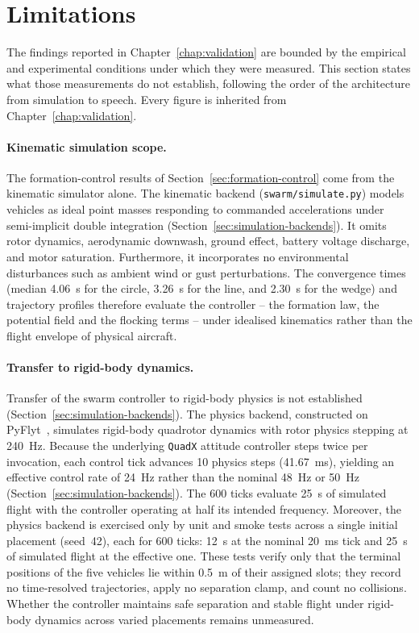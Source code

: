 \section{Limitations}
\label{sec:limitations}
The findings reported in Chapter~\ref{chap:validation} are bounded by the empirical and experimental
conditions under which they were measured. This section states what those measurements do not establish,
following the order of the architecture from simulation to speech. Every figure is inherited from
Chapter~\ref{chap:validation}.

\paragraph{Kinematic simulation scope.} The formation-control results of
Section~\ref{sec:formation-control} come from the kinematic simulator alone. The kinematic backend
(\texttt{swarm/simulate.py}) models vehicles as ideal point masses responding to commanded
accelerations under semi-implicit double integration (Section~\ref{sec:simulation-backends}). It
omits rotor dynamics, aerodynamic downwash, ground effect, battery voltage discharge, and motor
saturation. Furthermore, it incorporates no environmental disturbances such as ambient wind or gust
perturbations. The convergence times (median 4.06~s for the circle, 3.26~s for the line, and 2.30~s for
the wedge) and trajectory profiles therefore evaluate the controller -- the formation law, the
potential field and the flocking terms -- under idealised kinematics rather than the flight envelope
of physical aircraft.

\paragraph{Transfer to rigid-body dynamics.} Transfer of the swarm controller to rigid-body physics is
not established (Section~\ref{sec:simulation-backends}). The physics backend, constructed on
PyFlyt~\cite{pyflyt}, simulates rigid-body quadrotor dynamics with rotor physics stepping at 240~Hz.
Because the underlying \texttt{QuadX} attitude controller steps twice per invocation, each control tick
advances 10 physics steps (41.67~ms), yielding an effective control rate of 24~Hz rather than the
nominal 48~Hz or 50~Hz (Section~\ref{sec:simulation-backends}). The 600 ticks evaluate 25~s of simulated
flight with the controller operating at half its intended frequency. Moreover, the physics backend is
exercised only by unit and smoke tests across a single initial placement (seed~42), each for 600 ticks: 12~s at the nominal 20~ms tick and
25~s of simulated flight at the effective one. These tests
verify only that the terminal positions of the five vehicles lie within 0.5~m of their assigned slots;
they record no time-resolved trajectories, apply no separation clamp, and count no collisions. Whether
the controller maintains safe separation and stable flight under rigid-body dynamics across varied
placements remains unmeasured.

